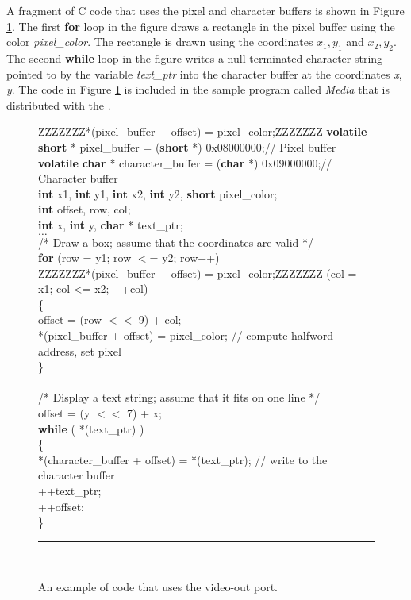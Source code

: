 A fragment of C code that uses the pixel and character buffers is shown in 
Figure \ref{fig:video_C}.  The first {\bf for} loop in the figure draws a rectangle in 
the pixel buffer using the color {\it pixel\_color}. The rectangle is drawn using the
coordinates $x_1, y_1$ and $x_2, y_2$.  The second {\bf while} loop in the 
figure writes a null-terminated character
string pointed to by the variable {\it text\_ptr} into the character buffer at the
coordinates {\it x}, {\it y}.  The code in Figure \ref{fig:video_C}
is included in the sample program called {\it Media} that is 
distributed with the \productNameMed{}. 


\begin{figure}[h!]
\begin{center}
\begin{minipage}[t]{12.5 cm}
\begin{tabbing}
ZZZ\=ZZ\=ZZ\=*(pixel\_buffer + offset) = pixel\_color;ZZZZZZZ\= \kill
{\bf volatile} {\bf short} * pixel\_buffer = ({\bf short} *) 0x08000000;\>\>\>\>// Pixel buffer\\
{\bf volatile} {\bf char} * character\_buffer = ({\bf char} *) 0x09000000;\>\>\>\>// Character buffer\\
{\bf int} x1, {\bf int} y1, {\bf int} x2, {\bf int} y2, {\bf short} pixel\_color;\\
{\bf int} offset, row, col;\\
{\bf int} x, {\bf int} y, {\bf char} * text\_ptr;\\
$\ldots$\\
/* Draw a box; assume that the coordinates are valid */\\
{\bf for} (row = y1; row $<$= y2; row++)\\
ZZZ\=ZZ\=ZZ\=*(pixel\_buffer + offset) = pixel\_color;ZZZZZZZ\= \kill
{} (col = x1; col <= x2; ++col)\\
\>\{\\
\>\>offset = (row $<<$ 9) + col;\\
\>\>*(pixel\_buffer + offset) = pixel\_color;	\>\>// compute halfword address, set pixel\\
\>\}\\
\\
/* Display a text string; assume that it fits on one line */\\
offset = (y $<<$ 7) + x;\\
{\bf while} ( *(text\_ptr) )\\
\{\\
\>*(character\_buffer + offset) = *(text\_ptr);	\>\>\>// write to the character buffer\\
\>++text\_ptr;\\
\>++offset;\\
\}\rule{6.0in}{0in}~\\
\end{tabbing}
\end{minipage}
\end{center}
	\vspace{-0.33in}\caption{An example of code that uses the video-out port.}
   \label{fig:video_C}
\end{figure}


